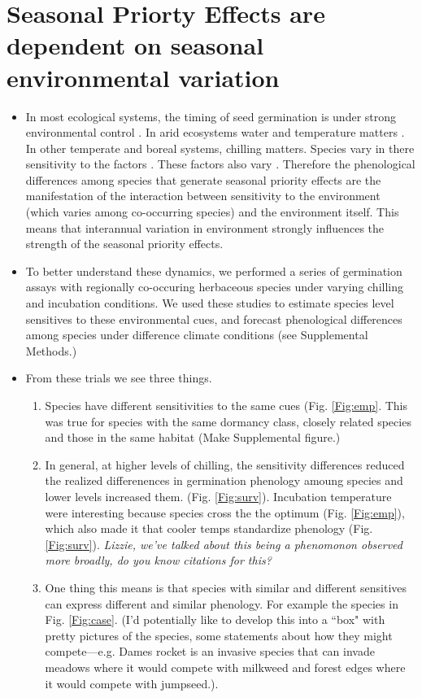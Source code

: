\documentclass{article}[12pt]
\begin{document}
\section*{Seasonal Priorty Effects are dependent on seasonal environmental variation}
\begin{itemize}
\item In most ecological systems, the timing of seed germination is under strong environmental control \citep{}. In arid ecosystems water and temperature matters \citep{}. In other temperate and boreal systems, chilling matters. Species vary in there sensitivity to the factors \citep{}. These factors also vary \citep{}. Therefore the phenological differences among species that generate seasonal priority effects are the manifestation of the interaction between sensitivity to the environment (which varies among co-occurring species) and the environment itself. This means that interannual variation in environment strongly influences the strength of the seasonal priority effects.

\item To better understand these dynamics, we performed a series of germination assays with regionally co-occuring herbaceous species under varying chilling and incubation conditions. We used these studies to estimate species level sensitives to these environmental cues, and forecast phenological differences among species under difference climate conditions (see Supplemental Methods.)

\item From these trials we see three things. 
\begin{enumerate}
\item Species have different sensitivities to the same cues (Fig. \ref{Fig:emp}. This was true for species with the same dormancy class, closely related species and those in the same habitat (Make Supplemental figure.)

\item In general, at higher levels of chilling, the sensitivity differences reduced the realized differenences in germination phenology amoung species and lower levels increased them. (Fig. \ref{Fig:surv}). Incubation temperature were interesting because species cross the the optimum (Fig. \ref{Fig:emp}), which also made it that cooler temps standardize phenology (Fig. \ref{Fig:surv}). \textit{Lizzie, we've talked about this being a phenomonon observed more broadly, do you know citations for this?}

\item One thing this means is that species with similar and different sensitives can express different and similar phenology. For example the species in Fig. \ref{Fig:case}. (I'd potentially like to develop this into a ``box" with pretty pictures of the species, some statements about how they might compete---e.g. Dames rocket is an invasive species that can invade meadows where it would compete with milkweed and forest edges where it would compete with jumpseed.).
\end{enumerate}


\end{itemize}
\end{document}
